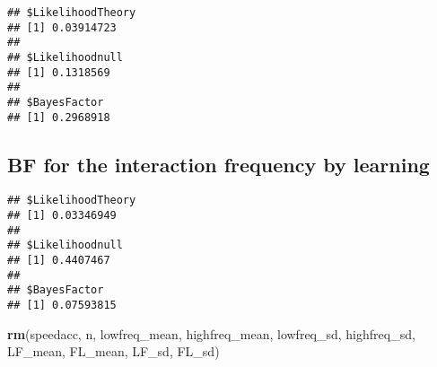 \documentclass[
]{article}
\newenvironment{Shaded}{\begin{snugshade}}{\end{snugshade}}
\newcommand{\CommentTok}[1]{\textcolor[rgb]{0.56,0.35,0.01}{\textit{#1}}}
\newcommand{\DataTypeTok}[1]{\textcolor[rgb]{0.13,0.29,0.53}{#1}}
\newcommand{\DecValTok}[1]{\textcolor[rgb]{0.00,0.00,0.81}{#1}}
\newcommand{\KeywordTok}[1]{\textcolor[rgb]{0.13,0.29,0.53}{\textbf{#1}}}
\newcommand{\NormalTok}[1]{#1}
\newcommand{\OperatorTok}[1]{\textcolor[rgb]{0.81,0.36,0.00}{\textbf{#1}}}
\newcommand{\StringTok}[1]{\textcolor[rgb]{0.31,0.60,0.02}{#1}}
\begin{document}
\begin{verbatim}
## $LikelihoodTheory
## [1] 0.03914723
## 
## $Likelihoodnull
## [1] 0.1318569
## 
## $BayesFactor
## [1] 0.2968918
\end{verbatim}

\hypertarget{bf-for-the-interaction-frequency-by-learning}{%
\subsection{BF for the interaction frequency by
learning}\label{bf-for-the-interaction-frequency-by-learning}}

\begin{Shaded}
\end{Shaded}

\begin{verbatim}
## $LikelihoodTheory
## [1] 0.03346949
## 
## $Likelihoodnull
## [1] 0.4407467
## 
## $BayesFactor
## [1] 0.07593815
\end{verbatim}

\begin{Shaded}
\begin{Highlighting}[]
\KeywordTok{rm}\NormalTok{(speedacc, n, lowfreq_mean, highfreq_mean, lowfreq_sd, highfreq_sd, LF_mean, FL_mean, LF_sd, FL_sd)}
\end{Highlighting}
\end{Shaded}
\end{document}
